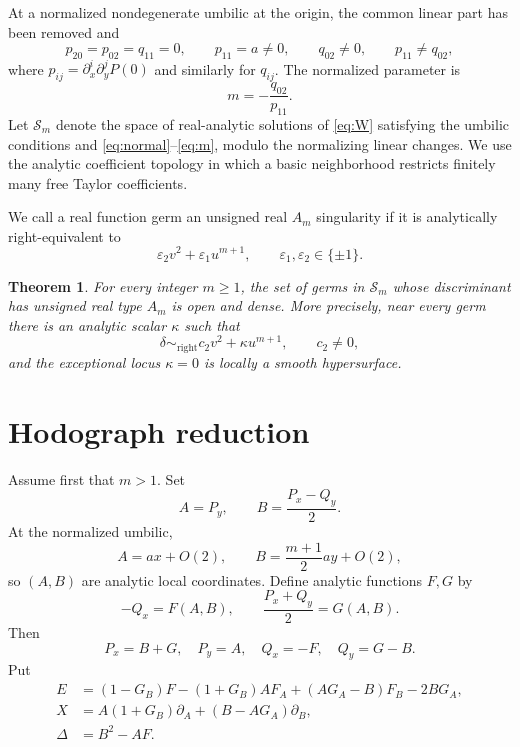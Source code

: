 \documentclass[11pt]{article}
\newtheorem{theorem}{Theorem}
\theoremstyle{remark}
\begin{document}
At a normalized nondegenerate umbilic at the origin, the common linear part
has been removed and
\begin{equation}\label{eq:normal}
 p_{20}=p_{02}=q_{11}=0,
 \qquad
 p_{11}=a\ne0,
 \qquad
 q_{02}\ne0,
 \qquad
 p_{11}\ne q_{02},
\end{equation}
where $p_{ij}=\partial_x^i\partial_y^jP(0)$ and similarly for $q_{ij}$.
The normalized parameter is
\begin{equation}\label{eq:m}
 m=-\frac{q_{02}}{p_{11}}.
\end{equation}
Let $\mathcal S_m$ denote the space of real-analytic solutions of
\eqref{eq:W} satisfying the umbilic conditions and
\eqref{eq:normal}--\eqref{eq:m}, modulo the normalizing linear changes.
We use the analytic coefficient topology in which a basic neighborhood
restricts finitely many free Taylor coefficients.

We call a real function germ an unsigned real $A_m$ singularity if it is
analytically right-equivalent to
\[
 \varepsilon_2v^2+\varepsilon_1u^{m+1},
 \qquad \varepsilon_1,\varepsilon_2\in\{\pm1\}.
\]

\begin{theorem}\label{thm:main}
For every integer $m\ge1$, the set of germs in $\mathcal S_m$ whose
discriminant has unsigned real type $A_m$ is open and dense.  More precisely,
near every germ there is an analytic scalar $\kappa$ such that
\[
 \delta\sim_{\mathrm{right}}c_2v^2+\kappa u^{m+1},
 \qquad c_2\ne0,
\]
and the exceptional locus $\kappa=0$ is locally a smooth hypersurface.
\end{theorem}

\section{Hodograph reduction}

Assume first that $m>1$.  Set
\begin{equation}\label{eq:AB}
 A=P_y,
 \qquad
 B=\frac{P_x-Q_y}{2}.
\end{equation}
At the normalized umbilic,
\[
 A=ax+O(2),
 \qquad
 B=\frac{m+1}{2}ay+O(2),
\]
so $(A,B)$ are analytic local coordinates.  Define analytic functions
$F,G$ by
\begin{equation}\label{eq:FG}
 -Q_x=F(A,B),
 \qquad
 \frac{P_x+Q_y}{2}=G(A,B).
\end{equation}
Then
\[
 P_x=B+G,
 \quad P_y=A,
 \quad Q_x=-F,
 \quad Q_y=G-B.
\]
Put
\begin{align}
 E&=(1-G_B)F-(1+G_B)AF_A+(AG_A-B)F_B-2BG_A,
 \label{eq:E}\\
 X&=A(1+G_B)\partial_A+(B-AG_A)\partial_B,
 \label{eq:X}\\
 \Delta&=B^2-AF.\label{eq:Delta}
\end{align}
\end{document}
